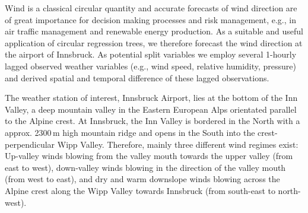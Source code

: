 \documentclass[twoside]{report}
\begin{document}

Wind is a classical circular quantity and accurate forecasts of wind direction
are of great importance for decision making processes and risk management,
e.g., in air traffic management and renewable energy production. As a suitable
and useful application of circular regression trees, we therefore forecast the
wind direction at the airport of Innsbruck. As potential split variables we
employ several 1-hourly lagged observed weather variables (e.g., wind speed,
relative humidity, pressure) and derived spatial and temporal difference of
these lagged observations.


The weather station of interest, Innsbruck Airport, lies at the bottom of the
Inn Valley, a deep mountain valley in the Eastern European Alps orientated
parallel to the Alpine crest. At Innsbruck, the Inn Valley is bordered in the
North with a approx. 2300\,m high mountain ridge and opens in the South into
the crest-perpendicular Wipp Valley. Therefore, mainly three different wind
regimes exist: Up-valley winds blowing from the valley mouth towards the upper
valley (from east to west), down-valley winds blowing in the direction of the
valley mouth (from west to east), and dry and warm downslope winds blowing
across the Alpine crest along the Wipp Valley towards Innsbruck (from
south-east to north-west).
\end{document}
